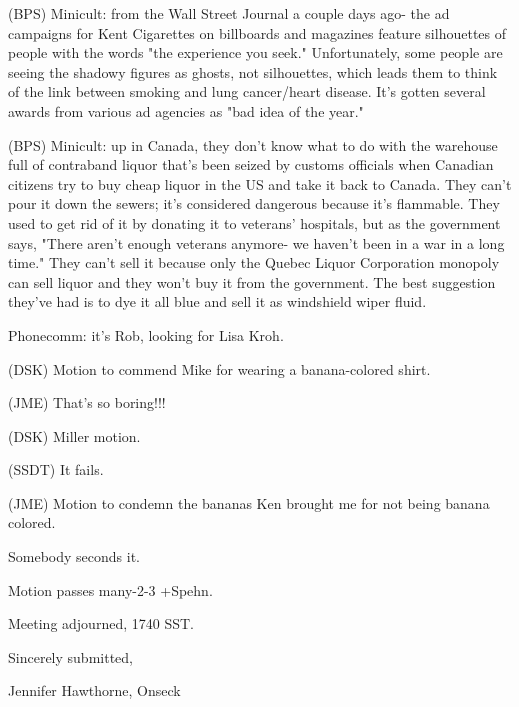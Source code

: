 \documentclass[12pt]{article}
\begin{document}
(BPS) Minicult: from the Wall Street Journal a couple days ago- the ad campaigns for Kent Cigarettes on billboards and magazines feature silhouettes of people with the words "the experience you seek." Unfortunately, some people are seeing the shadowy figures as ghosts, not silhouettes, which leads them to think of the link between smoking and lung cancer/heart disease. It's gotten several awards from various ad agencies as "bad idea of the year."

(BPS) Minicult: up in Canada, they don't know what to do with the warehouse full of contraband liquor that's been seized by customs officials when Canadian citizens try to buy cheap liquor in the US and take it back to Canada. They can't pour it down the sewers; it's considered dangerous because it's flammable. They used to get rid of it by donating it to veterans' hospitals, but as the government says, "There aren't enough veterans anymore- we haven't been in a war in a long time." They can't sell it because only the Quebec Liquor Corporation monopoly can sell liquor and they won't buy it from the government. The best suggestion they've had is to dye it all blue and sell it as windshield wiper fluid.

Phonecomm: it's Rob, looking for Lisa Kroh.

(DSK) Motion to commend Mike for wearing a banana-colored shirt.

(JME) That's so boring!!!

(DSK) Miller motion.

(SSDT) It fails.

(JME) Motion to condemn the bananas Ken brought me for not being banana colored.

Somebody seconds it.

Motion passes many-2-3 +Spehn.

\vspace{12pt}

\noindent
Meeting adjourned, 1740 SST.

\vspace{18pt}

\centerline{Sincerely submitted,}
\centerline{Jennifer Hawthorne, Onseck}
\end{document}
